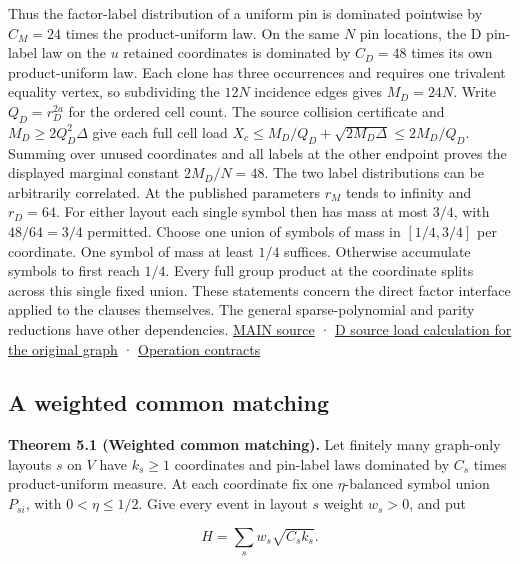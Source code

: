 \documentclass[
  11pt,
]{article}
\begin{document}
Thus the factor-label distribution of a uniform pin is dominated
pointwise by \(C_M=24\) times the product-uniform law. On the same \(N\)
pin locations, the D pin-label law on the \(u\) retained coordinates is
dominated by \(C_D=48\) times its own product-uniform law. Each clone
has three occurrences and requires one trivalent equality vertex, so
subdividing the \(12N\) incidence edges gives \(M_D=24N\). Write
\(Q_D=r_D^{2a}\) for the ordered cell count. The source collision
certificate and \(M_D\ge2Q_D^2\Delta\) give each full cell load
\(X_c\le M_D/Q_D+\sqrt{2M_D\Delta}\le2M_D/Q_D\). Summing over unused
coordinates and all labels at the other endpoint proves the displayed
marginal constant \(2M_D/N=48\). The two label distributions can be
arbitrarily correlated. At the published parameters \(r_M\) tends to
infinity and \(r_D=64\). For either layout each single symbol then has
mass at most \(3/4\), with \(48/64=3/4\) permitted. Choose one union of
symbols of mass in \([1/4,3/4]\) per coordinate. One symbol of mass at
least \(1/4\) suffices. Otherwise accumulate symbols to first reach
\(1/4\). Every full group product at the coordinate splits across this
single fixed union. These statements concern the direct factor interface
applied to the clauses themselves. The general sparse-polynomial and
parity reductions have other dependencies.
\href{https://github.com/openai/math/blob/main/preprints/The-Exponential-Time-Hypothesis-is-False-October-25-2026/build/main_full_version.tex}{MAIN
source} · \href{https://github.com/dch-and-Elara/some-research-inspired-by-openais-eth-preprint/tree/main/root-separation}{D source
load calculation for the original graph} ·
\href{https://github.com/dch-and-Elara/some-research-inspired-by-openais-eth-preprint/tree/main/rank-budget-barriers}{Operation contracts}

\subsection{A weighted common
matching}\label{a-weighted-common-matching}

\textbf{Theorem 5.1 (Weighted common matching).} Let finitely many graph-only layouts \(s\) on \(V\)
have \(k_s\ge1\) coordinates and pin-label laws dominated by \(C_s\)
times product-uniform measure. At each coordinate fix one
\(\eta\)-balanced symbol union \(P_{si}\), with \(0<\eta\le1/2\). Give
every event in layout \(s\) weight \(w_s>0\), and put

\[
 H=\sum_s w_s\sqrt{C_s k_s}.
\]
\end{document}
